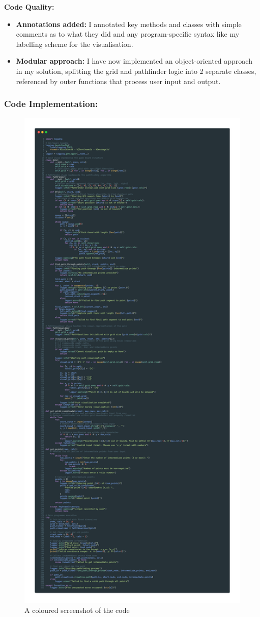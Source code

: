 \textbf{Code Quality:}
\begin{itemize}
    \item \textbf{Annotations added:} I annotated key methods and classes with simple comments as to what they did and any program-specific syntax like my labelling scheme for the visualisation.

    \item \textbf{Modular approach:} I have now implemented an object-oriented approach in my solution, splitting the grid and pathfinder logic into 2 separate classes, referenced by outer functions that process user input and output.
\end{itemize}

\newpage

\subsubsection{Code Implementation:}




\begin{figure}[htbp!]
    \centering
    \includegraphics[width=0.61\linewidth]{Images/sa2.png}
    \caption{A coloured screenshot of the code}
\end{figure}
\textbf{}\newline
\newpage

